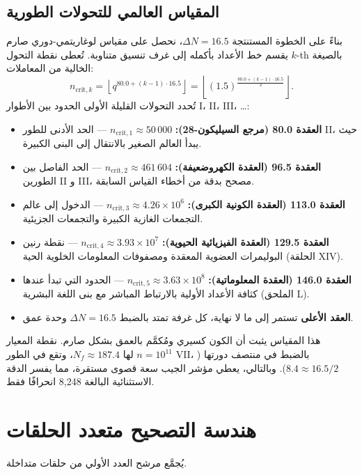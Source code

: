 \documentclass[11pt,a4paper]{article}
\begin{document}
	\subsection{المقياس العالمي للتحولات الطورية}
	بناءً على الخطوة المستنتجة $\Delta N = 16.5$، نحصل على مقياس لوغاريتمي-دوري صارم يقسم خط الأعداد بأكمله إلى غرف تنسيق متناوبة. تُعطى نقطة التحول $k$-th بالصيغة الخالية من المعاملات:
	\begin{equation}
		n_{\mathrm{crit},k} = \left\lfloor q^{80.0 + (k-1)\cdot 16.5} \right\rfloor 
		= \left\lfloor (1.5)^{\frac{80.0+(k-1)\cdot 16.5}{3}} \right\rfloor .
	\end{equation}
	تُحدد التحولات القليلة الأولى الحدود بين الأطوار I، II، III، \dots:
	\begin{itemize}
		\item \textbf{العقدة 80.0 (مرجع السيليكون-28):} \(n_{\mathrm{crit},1} \approx 50\,000\) — الحد الأدنى للطور II، حيث يبدأ العالم الصغير بالانتقال إلى البنى الكبيرة.
		\item \textbf{العقدة 96.5 (العقدة الكهروضعيفة):} \(n_{\mathrm{crit},2} \approx 461\,604\) — الحد الفاصل بين الطورين II و III، مصحح بدقة من أخطاء القياس السابقة.
		\item \textbf{العقدة 113.0 (العقدة الكونية الكبرى):} \(n_{\mathrm{crit},3} \approx 4.26\times10^6\) — الدخول إلى عالم التجمعات الغازية الكبيرة والتجمعات الجزيئية.
		\item \textbf{العقدة 129.5 (العقدة الفيزيائية الحيوية):} \(n_{\mathrm{crit},4} \approx 3.93\times10^7\) — نقطة رنين البوليمرات العضوية المعقدة ومصفوفات المعلومات الخلوية الحية (الحلقة XIV).
		\item \textbf{العقدة 146.0 (العقدة المعلوماتية):} \(n_{\mathrm{crit},5} \approx 3.63\times10^8\) — الحدود التي تبدأ عندها كثافة الأعداد الأولية بالارتباط المباشر مع بنى اللغة البشرية (الملحق L).
		\item \textbf{العقد الأعلى} تستمر إلى ما لا نهاية، كل غرفة تمتد بالضبط $\Delta N = 16.5$ وحدة عمق.
	\end{itemize}
	
	هذا المقياس يثبت أن الكون كسيري ومُكمَّم بالعمق بشكل صارم. نقطة المعيار $n=10^{11}$ لها $N_f \approx 187.4$، وتقع في الطور VII، بالضبط في منتصف دورتها ($8.4 \approx 16.5/2$). وبالتالي، يعطي مؤشر الجيب سعة قصوى مستقرة، مما يفسر الدقة الاستثنائية البالغة 8,248 انحرافًا فقط.
	
	\section{هندسة التصحيح متعدد الحلقات}
	\label{sec:multiloop}
	يُجمَّع مرشح العدد الأولي من حلقات متداخلة.
	
\end{document}
